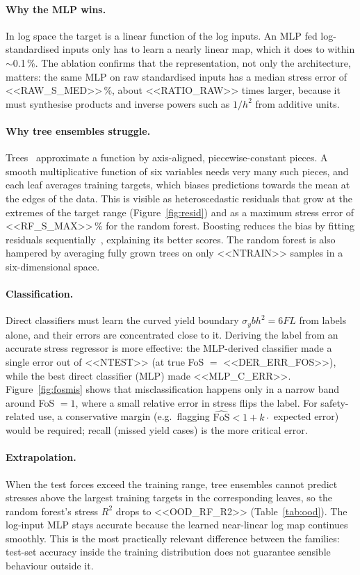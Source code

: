 \documentclass[11pt,a4paper]{article}
\begin{document}
\paragraph{Why the MLP wins.} In log space the target is a linear function of the log inputs. An MLP fed
log-standardised inputs only has to learn a nearly linear map, which it does to within
$\sim$0.1\,\%. The ablation confirms that the representation, not only the architecture, matters: the same MLP on raw
standardised inputs has a median stress error of <<RAW_S_MED>>\,\%, about <<RATIO_RAW>> times larger, because it must
synthesise products and inverse powers such as $1/h^2$ from additive units.

\paragraph{Why tree ensembles struggle.} Trees~\cite{hastie2009} approximate a function by axis-aligned, piecewise-constant pieces. A
smooth multiplicative function of six variables needs very many such pieces, and each leaf averages training targets,
which biases predictions towards the mean at the edges of the data. This is visible as heteroscedastic residuals that
grow at the extremes of the target range (Figure~\ref{fig:resid}) and as a maximum stress error of <<RF_S_MAX>>\,\% for the
random forest. Boosting reduces the bias by fitting residuals sequentially~\cite{friedman2001}, explaining its better scores.
The random forest is also hampered by averaging fully grown trees on only <<NTRAIN>> samples in a six-dimensional space.

\paragraph{Classification.} Direct classifiers must learn the curved yield boundary $\sigma_y b h^2=6FL$ from labels
alone, and their errors are concentrated close to it. Deriving the label from an accurate stress regressor is more
effective: the MLP-derived classifier made a single error out of <<NTEST>> (at true FoS $=$ <<DER_ERR_FOS>>), while
the best direct classifier (MLP) made <<MLP_C_ERR>>. Figure~\ref{fig:fosmis} shows that misclassification happens only in
a narrow band around FoS $=1$, where a small relative error in stress flips the label. For safety-related use, a
conservative margin (e.g.\ flagging $\widehat{\mathrm{FoS}}<1+k\cdot$ expected error) would be required; recall
(missed yield cases) is the more critical error.

\paragraph{Extrapolation.} When the test forces exceed the training range, tree ensembles cannot predict stresses above
the largest training targets in the corresponding leaves, so the random forest's stress $R^2$ drops to <<OOD_RF_R2>>
(Table~\ref{tab:ood}). The log-input MLP stays accurate because the learned near-linear log map continues smoothly.
This is the most practically relevant difference between the families: test-set accuracy inside the training
distribution does not guarantee sensible behaviour outside it.
\end{document}
